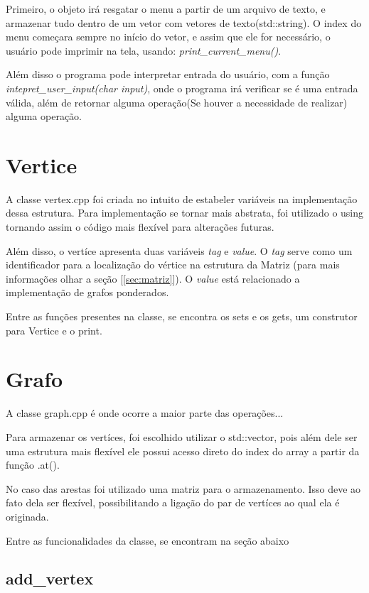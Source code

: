 \documentclass[12pt]{article}
\begin{document}
  Primeiro, o objeto irá resgatar o menu a partir de um arquivo de texto, e armazenar
  tudo dentro de um vetor com vetores de texto(std::string). O index do menu começara
  sempre no início do vetor, e assim que ele for necessário, o usuário pode imprimir na tela, usando:
  \emph{print\_current\_menu()}.

  Além disso o programa pode interpretar entrada do usuário, com a função
  \emph{intepret\_user\_input(char input)}, onde o programa irá verificar se é uma entrada
  válida, além de retornar alguma operação(Se houver a necessidade de realizar)
  alguma operação.

  \section{Vertice}

  A classe vertex.cpp foi criada no intuito de estabeler variáveis na implementação dessa estrutura. 
  Para implementação se tornar mais abstrata, foi utilizado o using tornando assim o código mais flexível 
  para alterações futuras.
  
  Além disso, o vertíce apresenta duas variáveis \emph{tag} e \emph{value}. O \emph{tag} serve como um identificador para 
  a localização do vértice na estrutura da Matriz (para mais informações olhar a seção [\ref{sec:matriz}]).
  O \emph{value} está relacionado a implementação de grafos ponderados.

  Entre as funções presentes na classe, se encontra os sets e os gets, um construtor para Vertice e o 
  print.

  \section{Grafo}

  A classe graph.cpp é onde ocorre a maior parte das operações...
  
  Para armazenar os vertíces, foi escolhido utilizar o std::vector, pois além dele ser uma estrutura mais 
  flexível ele possui acesso direto do index do array a partir da função .at().

  No caso das arestas foi utilizado uma matriz para o armazenamento. Isso deve ao fato dela ser flexível, 
  possibilitando a ligação do par de vertíces ao qual ela é originada.

  Entre as funcionalidades da classe, se encontram na seção abaixo

  \subsection{add\_vertex}
  
\end{document}
